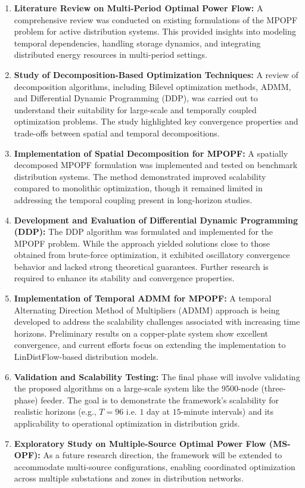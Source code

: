 \begin{enumerate}
    \item \textbf{Literature Review on Multi-Period Optimal Power Flow:} A comprehensive review was conducted on existing formulations of the MPOPF problem for active distribution systems. This provided insights into modeling temporal dependencies, handling storage dynamics, and integrating distributed energy resources in multi-period settings.

    \item \textbf{Study of Decomposition-Based Optimization Techniques:} A review of decomposition algorithms, including Bilevel optimization methods, ADMM, and Differential Dynamic Programming (DDP), was carried out to understand their suitability for large-scale and temporally coupled optimization problems. The study highlighted key convergence properties and trade-offs between spatial and temporal decompositions.

    \item \textbf{Implementation of Spatial Decomposition for MPOPF:} A spatially decomposed MPOPF formulation was implemented and tested on benchmark distribution systems. The method demonstrated improved scalability compared to monolithic optimization, though it remained limited in addressing the temporal coupling present in long-horizon studies.

    \item \textbf{Development and Evaluation of Differential Dynamic Programming (DDP):} The DDP algorithm was formulated and implemented for the MPOPF problem. While the approach yielded solutions close to those obtained from brute-force optimization, it exhibited oscillatory convergence behavior and lacked strong theoretical guarantees. Further research is required to enhance its stability and convergence properties.

    \item \textbf{Implementation of Temporal ADMM for MPOPF:} A temporal Alternating Direction Method of Multipliers (ADMM) approach is being developed to address the scalability challenges associated with increasing time horizons. Preliminary results on a copper-plate system show excellent convergence, and current efforts focus on extending the implementation to LinDistFlow-based distribution models.

    \item \textbf{Validation and Scalability Testing:} The final phase will involve validating the proposed algorithms on a large-scale system like the 9500-node (three-phase) feeder. The goal is to demonstrate the framework’s scalability for realistic horizons (e.g., $T=96$ i.e. $1$ day at $15$-minute intervals) and its applicability to operational optimization in distribution grids.

    \item \textbf{Exploratory Study on Multiple-Source Optimal Power Flow (MS-OPF):} As a future research direction, the framework will be extended to accommodate multi-source configurations, enabling coordinated optimization across multiple substations and zones in distribution networks.
\end{enumerate}
